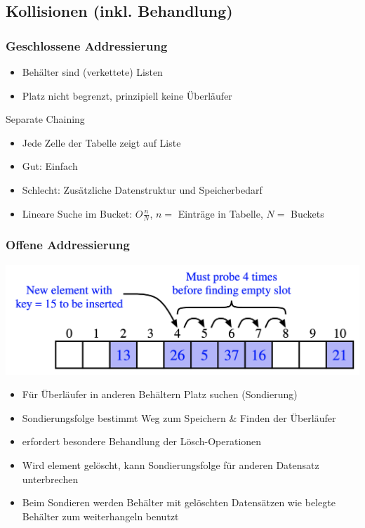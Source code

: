 \documentclass[a4paper, landscape, 8pt]{scrartcl}
\begin{document}
\begin{multicols*}{4}
            \subsection{Kollisionen (inkl. Behandlung)}
                \subsubsection{Geschlossene Addressierung}
                    \begin{itemize}
                        \item Behälter sind (verkettete) Listen
                        \item Platz nicht begrenzt, prinzipiell keine Überläufer
                    \end{itemize}
                    \textcolor{subsectioncolor}{Separate Chaining}
                    \begin{itemize}
                        \item Jede Zelle der Tabelle zeigt auf Liste
                        \item Gut: Einfach
                        \item Schlecht: Zusätzliche Datenstruktur und Speicherbedarf
                        \item Lineare Suche im Bucket: $O\frac{n}{N}$, $n =$ Einträge in Tabelle, $N =$ Buckets
                    \end{itemize}

                \subsubsection{Offene Addressierung}
                    \includegraphics[scale=0.15]{graphic/17_hashing_offene_addressierung}
                    \begin{itemize}
                        \item Für Überläufer in anderen Behältern Platz suchen (Sondierung)
                        \item Sondierungsfolge bestimmt Weg zum Speichern \& Finden der Überläufer
                        \item erfordert besondere Behandlung der Lösch-Operationen
                        \item Wird element gelöscht, kann Sondierungsfolge für anderen Datensatz unterbrechen
                        \item Beim Sondieren werden Behälter mit gelöschten Datensätzen wie belegte Behälter zum
                        weiterhangeln benutzt
                    \end{itemize}
        

\end{multicols*}
\end{document}
